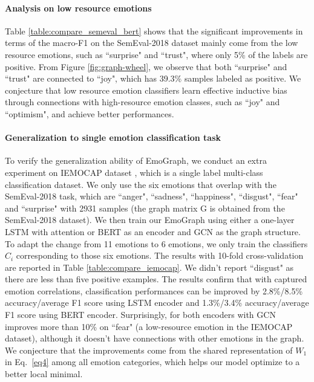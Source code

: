\documentclass[11pt,a4paper]{article}
\begin{document}
\paragraph{Analysis on low resource emotions} Table \ref{table:compare_semeval_bert} shows that the significant improvements in terms of the macro-F1 on the SemEval-2018 dataset mainly come from the low resource emotions, such as ``surprise" and ``trust", where only 5\% of the labels are positive. From Figure \ref{fig:graph-wheel}, we observe that both ``surprise" and ``trust" are connected to ``joy", which has 39.3\% samples labeled as positive. We conjecture that low resource emotion classifiers learn effective inductive bias through connections with high-resource emotion classes, such as ``joy" and ``optimism", and achieve better performances. 











\paragraph{Generalization to single emotion classification task}
To verify the generalization ability of EmoGraph, we conduct an extra experiment on IEMOCAP dataset \cite{busso2008iemocap}, which is a single label multi-class classification dataset. We only use the six emotions that overlap with the SemEval-2018 task, which are ``anger", ``sadness", ``happiness", ``disgust", ``fear" and ``surprise" with 2931 samples (the graph matrix G is obtained from the SemEval-2018 dataset). We then train our EmoGraph using either a one-layer LSTM with attention or BERT as an encoder and GCN as the graph structure. To adapt the change from 11 emotions to 6 emotions, we only train the classifiers $C_i$ corresponding to those six emotions. 
The results with 10-fold cross-validation are reported in Table \ref{table:compare_iemocap}. We didn't report ``disgust" as there are less than five positive examples. The results confirm that with captured emotion correlations, classification performances can be improved by 2.8\%/8.5\% accuracy/average F1 score using LSTM encoder and 1.3\%/3.4\% accuracy/average F1 score using BERT encoder. Surprisingly, for both encoders with GCN improves more than 10\% on ``fear" (a low-resource emotion in the IEMOCAP dataset), although it doesn't have connections with other emotions in the graph. We conjecture that the improvements come from the shared representation of $W_1$ in Eq.~\ref{eq4} among all emotion categories, which helps our model optimize to a better local minimal.
\end{document}
